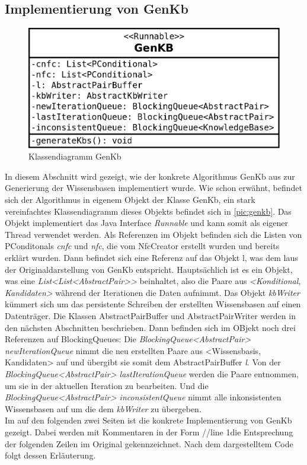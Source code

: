 \documentclass[12pt,a4paper]{article}
\begin{document}
\subsection{Implementierung von GenKb}
 

\begin{figure}
\includegraphics[width=0.5\linewidth]{bilder/genkb.png}
\caption{Klassendiagramm GenKb}
\label{pic:genkb}
\end{figure}



In diesem Abschnitt wird gezeigt, wie der konkrete Algorithmus GenKb aus \cite{beierle19} zur Generierung der Wissensbasen implementiert wurde. Wie schon erwähnt, befindet sich der Algorithmus in eigenem Objekt der Klasse GenKb, ein stark vereinfachtes Klassendiagramm dieses Objekts befindet sich in \autoref{pic:genkb}. Das Objekt implementiert das Java Interface \textit{Runnable} und kann somit als eigener Thread verwendet werden. Als Referenzen im Objekt befinden sich die Listen von PConditonals \textit{cnfc} und \textit{nfc}, die vom NfcCreator erstellt wurden und bereits erklärt wurden. Dann befindet sich eine Referenz auf das Objekt \glqq l\grqq \space, was dem \glqq l\grqq \space aus der Originaldarstellung von GenKb entspricht. Hauptsächlich ist es ein Objekt, was eine \textit{List<List<AbstractPair>>} beinhaltet, also die Paare aus \textit{<Konditional, Kandidaten>} während der Iterationen die Daten aufnimmt. Das Objekt \textit{kbWriter} kümmert sich um das persistente Schreiben der erstellten Wissensbasen auf einen Datenträger. Die Klassen AbstractPairBuffer und AbstractPairWriter werden in den nächsten Abschnitten beschrieben. Dann befinden sich im OBjekt noch drei Referenzen auf BlockingQueues: Die \textit{BlockingQueue<AbstractPair> newIterationQueue} nimmt die neu erstellten Paare aus <Wissensbasis, Kandidaten> auf und übergibt sie somit dem AbstractPairBuffer \textit{l}.
Von der \textit{BlockingQueue<AbstractPair> lastIterationQueue} werden die Paare entnommen, um sie in der aktuellen Iteration zu bearbeiten. Und die \textit{BlockingQueue<AbstractPair> inconsistentQueue} nimmt alle inkonsistenten Wissensbasen auf um die dem \textit{kbWriter} zu übergeben. \\
Im auf den folgenden zwei Seiten ist die konkrete Implementierung von GenKb gezeigt. Dabei werden mit Kommentaren in der Form \glqq //line 1\glqq \space die Entsprechung der folgenden Zeilen im Original gekennzeichnet. Nach dem dargestelltem Code folgt dessen Erläuterung.
\end{document}

